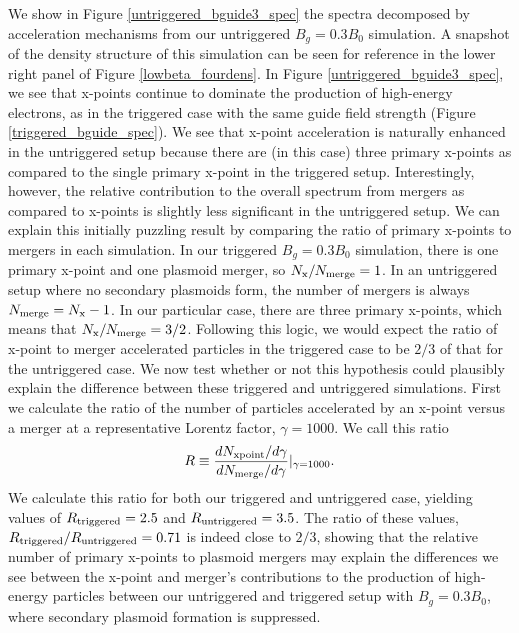 \documentclass[iop,twocolappendix]{emulateapj}
\begin{document}
We show in Figure \ref{untriggered_bguide3_spec} the spectra decomposed by acceleration mechanisms from our untriggered $B_{g}=0.3B_{0}$ simulation.  A snapshot of the density structure of this simulation can be seen for reference in the lower right panel of Figure \ref{lowbeta_fourdens}.  In Figure \ref{untriggered_bguide3_spec}, we see that x-points continue to dominate the production of high-energy electrons, as in the triggered case with the same guide field strength (Figure \ref{triggered_bguide_spec}).  We see that x-point acceleration is naturally enhanced in the untriggered setup because there are (in this case) three primary x-points as compared to the single primary x-point in the triggered setup.  Interestingly, however, the relative contribution to the overall spectrum from mergers as compared to x-points is slightly less significant in the untriggered setup.   We can explain this initially puzzling result by comparing the ratio of primary x-points to mergers in each simulation.  In our triggered $B_{g}=0.3B_{0}$ simulation, there is one primary x-point and one plasmoid merger, so $N_{\rm{x}}/N_{\rm{merge}}=1$.  In an untriggered setup where no secondary plasmoids form, the number of mergers is always $N_{\rm{merge}}=N_{\rm{x}}-1$.  In our particular case, there are three primary x-points, which means that $N_{\rm{x}}/N_{\rm{merge}}=3/2$.  Following this logic, we would expect the ratio of x-point to merger accelerated particles in the triggered case to be $2/3$ of that for the untriggered case.  We now test whether or not this hypothesis could plausibly explain the difference between these triggered and untriggered simulations.  First we calculate the ratio of the number of particles accelerated by an x-point versus a merger at a representative Lorentz factor, $\gamma = 1000$.  We call this ratio $$R \equiv \frac{dN_{\rm{xpoint}}/d\gamma}{dN_{\rm{merge}}/d\gamma}|_{\gamma=1000}.$$  We calculate this ratio for both our triggered and untriggered case, yielding values of $R_{\rm{triggered}}=2.5$ and $R_{\rm{untriggered}}=3.5$.  The ratio of these values, $R_{\rm{triggered}}/R_{\rm{untriggered}}=0.71$ is indeed close to $2/3$, showing that the relative number of primary x-points to plasmoid mergers may explain the differences we see between the x-point and merger's contributions to the production of high-energy particles between our untriggered and triggered setup with $B_{g}=0.3B_{0}$, where secondary plasmoid formation is suppressed.
\end{document}
